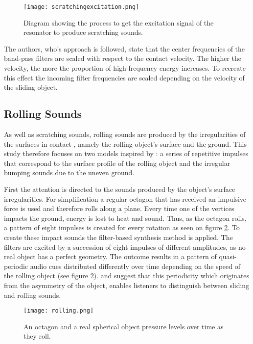 \begin{figure}[H]
  \centering
    \texttt{[image: scratchingexcitation.png]}
      \caption{Diagram showing the process to get the excitation signal of the resonator to produce scratching sounds.}
      \label{fig:scratchingimpulse}
\end{figure} 

The authors, who's approach is followed, state that the center frequencies of the band-pass filters are scaled with respect to the contact velocity. The higher the velocity, the more the proportion of high-frequency energy increases. To recreate this effect the incoming filter frequencies are scaled depending on the velocity of the sliding object.

\subsection{Rolling Sounds}\label{sec:rolling_synth}

As well as scratching sounds, rolling sounds are produced by the irregularities of the surfaces in contact \cite{van2001foleyautomatic}, namely the rolling object's surface and the ground. This study therefore focuses on two models inspired by \cite{farnell2010designing}: a series of repetitive impulses that correspond to the surface profile of the rolling object and the irregular bumping sounds due to the uneven ground.

First the attention is directed to the sounds produced by the object's surface irregularities. For simplification a regular octagon that has received an impulsive force is used and therefore rolls along a plane. Every time one of the vertices impacts the ground, energy is lost to heat and sound. Thus, as the octagon rolls, a pattern of eight impulses is created for every rotation as seen on figure \ref{fig:rolling}. To create these impact sounds the filter-based synthesis method is applied. The filters are excited by a succession of eight impulses of different amplitudes, as no real object has a perfect geometry. The outcome results in a pattern of quasi-periodic audio cues distributed differently over time depending on the speed of the rolling object (see figure \ref{fig:rolling}). \cite{houben1999auditory} and \cite{rath2003expressive} suggest that this periodicity which originates from the asymmetry of the object, enables listeners to distinguish between sliding and rolling sounds.


\begin{figure}[H]
  \centering
    \texttt{[image: rolling.png]}
      \caption{An octagon and a real spherical object pressure levels over time as they roll.}
      \label{fig:rolling}
\end{figure} 

